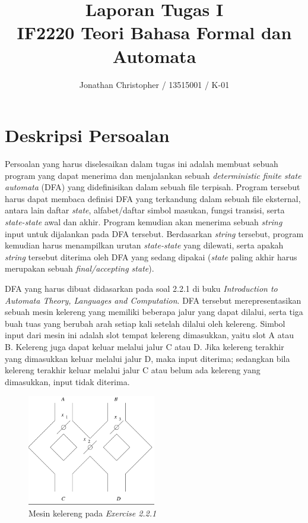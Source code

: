 \documentclass[a4paper,titlepage]{article}
\begin{document}
	\title{Laporan Tugas I \\ IF2220 Teori Bahasa Formal dan Automata}
	\author{Jonathan Christopher / 13515001 / K-01}
	\maketitle

	\section{Deskripsi Persoalan}

		Persoalan yang harus diselesaikan dalam tugas ini adalah membuat sebuah program yang dapat menerima dan menjalankan sebuah \textit{deterministic finite state automata} (DFA) yang didefinisikan dalam sebuah file terpisah. Program tersebut harus dapat membaca definisi DFA yang terkandung dalam sebuah file eksternal, antara lain daftar \textit{state}, alfabet/daftar simbol masukan, fungsi transisi, serta \textit{state-state} awal dan akhir. Program kemudian akan menerima sebuah \textit{string} input untuk dijalankan pada DFA tersebut. Berdasarkan \textit{string} tersebut, program kemudian harus menampilkan urutan \textit{state-state} yang dilewati, serta apakah \textit{string} tersebut diterima oleh DFA yang sedang dipakai (\textit{state} paling akhir harus merupakan sebuah \textit{final/accepting state}).

		DFA yang harus dibuat didasarkan pada soal 2.2.1 di buku \textit{Introduction to Automata Theory, Languages and Computation}. DFA tersebut merepresentasikan sebuah mesin kelereng yang memiliki beberapa jalur yang dapat dilalui, serta tiga buah tuas yang berubah arah setiap kali setelah dilalui oleh kelereng. Simbol input dari mesin ini adalah slot tempat kelereng dimasukkan, yaitu slot A atau B. Kelereng juga dapat keluar melalui jalur C atau D. Jika kelereng terakhir yang dimasukkan keluar melalui jalur D, maka input diterima; sedangkan bila kelereng terakhir keluar melalui jalur C atau belum ada kelereng yang dimasukkan, input tidak diterima.

		\begin{figure}[h]
		    \centering
		    \includegraphics[width=0.5\textwidth]{marble.png}
		    \caption{Mesin kelereng pada \textit{Exercise 2.2.1}}
		    \label{fig:marble}
		\end{figure}
\end{document}
